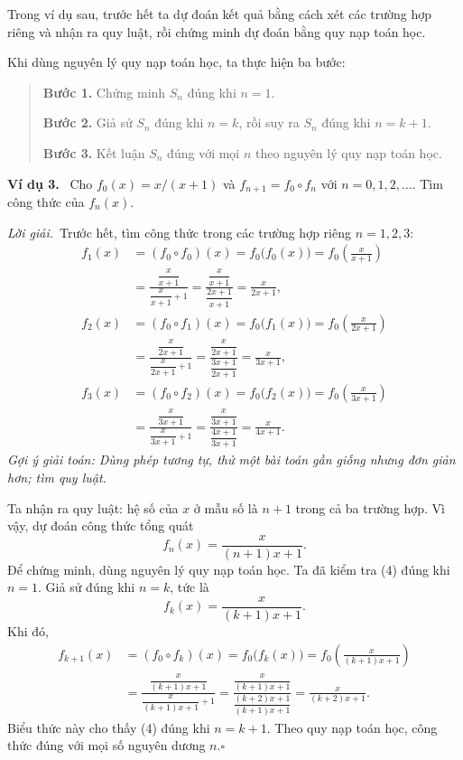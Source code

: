 \documentclass[12pt,a4paper]{article}
\newcommand{\ex}[1]{\par\medskip\noindent\textbf{Ví dụ #1.}\ }
\newcommand{\sol}{\par\noindent\textit{Lời giải.}\ }
\begin{document}
Trong ví dụ sau, trước hết ta dự đoán kết quả bằng cách xét các trường hợp riêng và nhận ra quy luật, rồi chứng minh dự đoán bằng quy nạp toán học.

Khi dùng nguyên lý quy nạp toán học, ta thực hiện ba bước:
\begin{quote}
\textbf{Bước 1.} Chứng minh $S_n$ đúng khi $n=1$.

\textbf{Bước 2.} Giả sử $S_n$ đúng khi $n=k$, rồi suy ra $S_n$ đúng khi $n=k+1$.

\textbf{Bước 3.} Kết luận $S_n$ đúng với mọi $n$ theo nguyên lý quy nạp toán học.
\end{quote}
\ex{3} Cho $f_0(x)=x/(x+1)$ và $f_{n+1}=f_0\circ f_n$ với $n=0,1,2,\ldots$. Tìm công thức của $f_n(x)$.
\sol Trước hết, tìm công thức trong các trường hợp riêng $n=1,2,3$:
\begin{align*}
f_1(x)&=(f_0\circ f_0)(x)=f_0\bigl(f_0(x)\bigr)=f_0\left(\frac{x}{x+1}\right)\\
&=\frac{\dfrac{x}{x+1}}{\dfrac{x}{x+1}+1}
=\frac{\dfrac{x}{x+1}}{\dfrac{2x+1}{x+1}}=\frac{x}{2x+1},\\[5pt]
f_2(x)&=(f_0\circ f_1)(x)=f_0\bigl(f_1(x)\bigr)=f_0\left(\frac{x}{2x+1}\right)\\
&=\frac{\dfrac{x}{2x+1}}{\dfrac{x}{2x+1}+1}
=\frac{\dfrac{x}{2x+1}}{\dfrac{3x+1}{2x+1}}=\frac{x}{3x+1},\\[5pt]
f_3(x)&=(f_0\circ f_2)(x)=f_0\bigl(f_2(x)\bigr)=f_0\left(\frac{x}{3x+1}\right)\\
&=\frac{\dfrac{x}{3x+1}}{\dfrac{x}{3x+1}+1}
=\frac{\dfrac{x}{3x+1}}{\dfrac{4x+1}{3x+1}}=\frac{x}{4x+1}.
\end{align*}
\noindent\textit{Gợi ý giải toán: Dùng phép tương tự, thử một bài toán gần giống nhưng đơn giản hơn; tìm quy luật.}

Ta nhận ra quy luật: hệ số của $x$ ở mẫu số là $n+1$ trong cả ba trường hợp. Vì vậy, dự đoán công thức tổng quát
\begin{equation}f_n(x)=\frac{x}{(n+1)x+1}.\tag{4}\end{equation}
Để chứng minh, dùng nguyên lý quy nạp toán học. Ta đã kiểm tra (4) đúng khi $n=1$. Giả sử đúng khi $n=k$, tức là
\[f_k(x)=\frac{x}{(k+1)x+1}.\]
Khi đó,
\begin{align*}
f_{k+1}(x)&=(f_0\circ f_k)(x)=f_0\bigl(f_k(x)\bigr)=f_0\left(\frac{x}{(k+1)x+1}\right)\\
&=\frac{\dfrac{x}{(k+1)x+1}}{\dfrac{x}{(k+1)x+1}+1}
=\frac{\dfrac{x}{(k+1)x+1}}{\dfrac{(k+2)x+1}{(k+1)x+1}}
=\frac{x}{(k+2)x+1}.
\end{align*}
Biểu thức này cho thấy (4) đúng khi $n=k+1$. Theo quy nạp toán học, công thức đúng với mọi số nguyên dương $n$.\hfill$\square$
\end{document}
